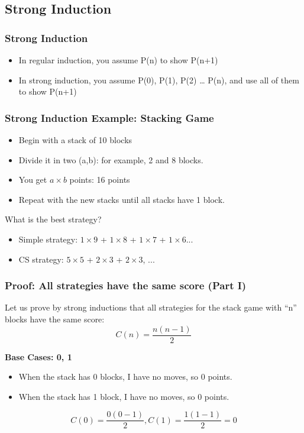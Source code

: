 \subsection{Strong Induction}

\begin{frame}
  \frametitle{Strong Induction}

  {\larger
    \begin{itemize}
    \item In regular induction, you assume P(n) to show P(n+1)

      \bigskip

    \item In strong induction, you assume P(0), P(1), P(2) \ldots
      P(n), and use all of them to show P(n+1)
    \end{itemize}
  }
\end{frame}

\begin{frame}
  \frametitle{Strong Induction Example: Stacking Game}
  {\larger
  \begin{itemize}
  \item Begin with a stack of 10 blocks
  \item Divide it in two (a,b): for example, 2 and 8 blocks.
  \item You get $a\times b$ points: 16 points
  \item Repeat with the new stacks until all stacks have 1 block.
  \end{itemize}

  \bigskip

  \alert{What is the best strategy?}
  \begin{itemize}
  \item Simple strategy: $1 \times 9$ + $1 \times 8$ + $1 \times 7$ + $1 \times 6$... 
  \item CS strategy: $5 \times 5$ + $2 \times 3$ + $2 \times 3$, ... 
  \end{itemize}
  }
\end{frame}

\begin{frame}
  \frametitle{Proof: All strategies have the same score (Part I)}

  {\larger
  Let us prove by strong inductions that all strategies for the stack
  game with ``n'' blocks have the same score:
  \begin{equation*}
    C(n) = \frac{n(n-1)}{2}
  \end{equation*}

  \bigskip

  {\bf Base Cases: 0, 1}
  \begin{itemize}
  \item When the stack has 0 blocks, I have no moves, so 0 points.
  \item When the stack has 1 block, I have no moves, so 0 points.
  \end{itemize}
  \begin{equation*}
    C(0) = \frac{0(0-1)}{2}, C(1) = \frac{1(1-1)}{2} = 0
  \end{equation*}
  }
\end{frame}


